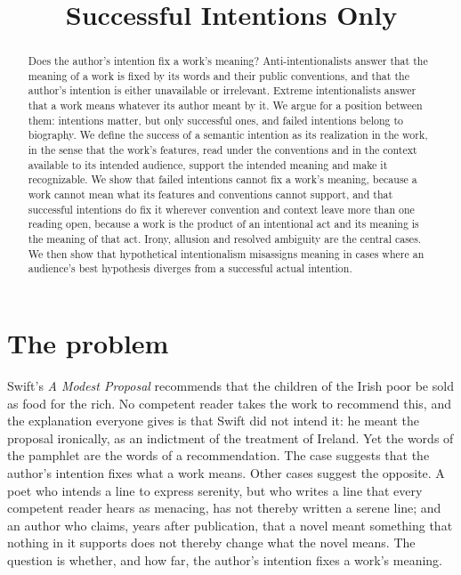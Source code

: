 \documentclass{situationist-preprint}
\title{Successful Intentions Only}
\begin{document}
\maketitle

\begin{abstract}
Does the author's intention fix a work's meaning? Anti-intentionalists answer that the meaning of a work is fixed by its words and their public conventions, and that the author's intention is either unavailable or irrelevant. Extreme intentionalists answer that a work means whatever its author meant by it. We argue for a position between them: intentions matter, but only successful ones, and failed intentions belong to biography. We define the success of a semantic intention as its realization in the work, in the sense that the work's features, read under the conventions and in the context available to its intended audience, support the intended meaning and make it recognizable. We show that failed intentions cannot fix a work's meaning, because a work cannot mean what its features and conventions cannot support, and that successful intentions do fix it wherever convention and context leave more than one reading open, because a work is the product of an intentional act and its meaning is the meaning of that act. Irony, allusion and resolved ambiguity are the central cases. We then show that hypothetical intentionalism misassigns meaning in cases where an audience's best hypothesis diverges from a successful actual intention.
\end{abstract}

\section{The problem}

Swift's \emph{A Modest Proposal} recommends that the children of the Irish poor be sold as food for the rich. No competent reader takes the work to recommend this, and the explanation everyone gives is that Swift did not intend it: he meant the proposal ironically, as an indictment of the treatment of Ireland. Yet the words of the pamphlet are the words of a recommendation. The case suggests that the author's intention fixes what a work means. Other cases suggest the opposite. A poet who intends a line to express serenity, but who writes a line that every competent reader hears as menacing, has not thereby written a serene line; and an author who claims, years after publication, that a novel meant something that nothing in it supports does not thereby change what the novel means. The question is whether, and how far, the author's intention fixes a work's meaning.
\end{document}
